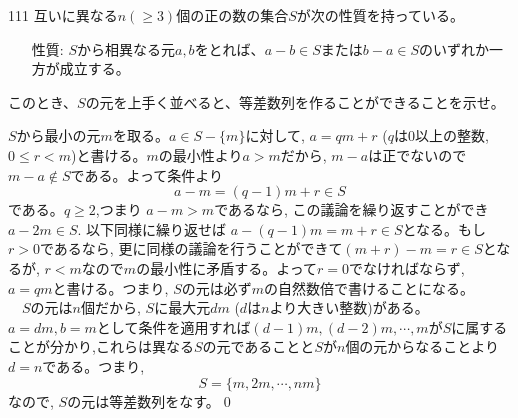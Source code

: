 \begin{thm}{111}{}{}
 互いに異なる$n (\ge 3)$個の正の数の集合$S$が次の性質を持っている。
 \begin{itemize}
  \item[性質:] $S$から相異なる元$a, b$をとれば、$a-b\in S$または$b-a\in S$のいずれか一方が成立する。
 \end{itemize}
 このとき、$S$の元を上手く並べると、等差数列を作ることができることを示せ。
\end{thm}

$S$から最小の元$m$を取る。$a\in S-\{m\}$に対して, $a=qm+r$  ($q$は0以上の整数, $0\leq r<m$)と書ける。$m$の最小性より$a>m$だから, $m-a$は正でないので$m-a\notin S$である。よって条件より
\[a-m=(q-1)m+r\in S\]
である。$q\geq 2$,つまり $a-m>m$であるなら, この議論を繰り返すことができ$a-2m\in S$. 以下同様に繰り返せば $a-(q-1)m=m+r\in S$となる。もし$r>0$であるなら, 更に同様の議論を行うことができて$(m+r)-m=r\in S$となるが, $r<m$なので$m$の最小性に矛盾する。よって$r=0$でなければならず, $a=qm$と書ける。つまり, $S$の元は必ず$m$の自然数倍で書けることになる。\\
　$S$の元は$n$個だから, $S$に最大元$dm$ ($d$は$n$より大きい整数)がある。$a=dm, b=m$として条件を適用すれば$(d-1)m,(d-2)m,\cdots, m$が$S$に属することが分かり,これらは異なる$S$の元であることと$S$が$n$個の元からなることより$d=n$である。つまり,
\[S=\{m,2m,\cdots, nm\}\]
なので, $S$の元は等差数列をなす。\qed